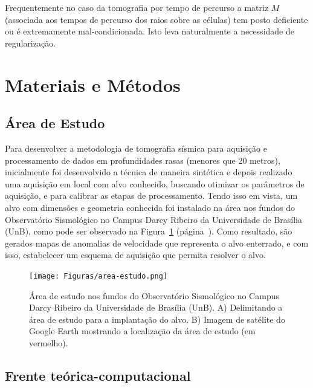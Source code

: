\documentclass[a4paper, 12 pt]{article} %
\begin{document}
Frequentemente no caso da tomografia por tempo de percurso a matriz $M$ (associada aos tempos de percurso dos raios sobre as células) tem posto deficiente ou é extremamente mal-condicionada. Isto leva naturalmente a necessidade de regularização.


\clearpage

\section{Materiais e Métodos}

\subsection{Área de Estudo}

Para desenvolver a metodologia de tomografia sísmica para aquisição e processamento de dados em profundidades rasas (menores que 20 metros), inicialmente foi desenvolvido a técnica de maneira sintética e depois realizado uma aquisição em local com alvo conhecido, buscando otimizar os parâmetros de aquisição, e para calibrar as etapas de processamento. Tendo isso em vista, um alvo com dimensões e geometria conhecida foi instalado na área nos fundos do Observatório Sismológico no Campus Darcy Ribeiro da Universidade de Brasília (UnB), como pode ser observado na Figura~\ref{area_estudo} (página~\pageref{area_estudo}).
Como resultado, são gerados mapas de anomalias de velocidade que representa o alvo enterrado, e com isso, estabelecer um esquema de aquisição que permita resolver o alvo.

\begin{figure}[!hbtp]
	\begin{center}
		\texttt{[image: Figuras/area-estudo.png]}
	\end{center}
	\caption{Área de estudo nos fundos do Observatório Sismológico no Campus Darcy Ribeiro da Universidade de Brasília (UnB). A) Delimitando a área de estudo para a implantação do alvo. B) Imagem de satélite do Google Earth mostrando a localização da área de estudo (em vermelho).}
	\label{area_estudo}
\end{figure}
\newpage

\clearpage

\subsection{Frente teórica-computacional}
\end{document}
